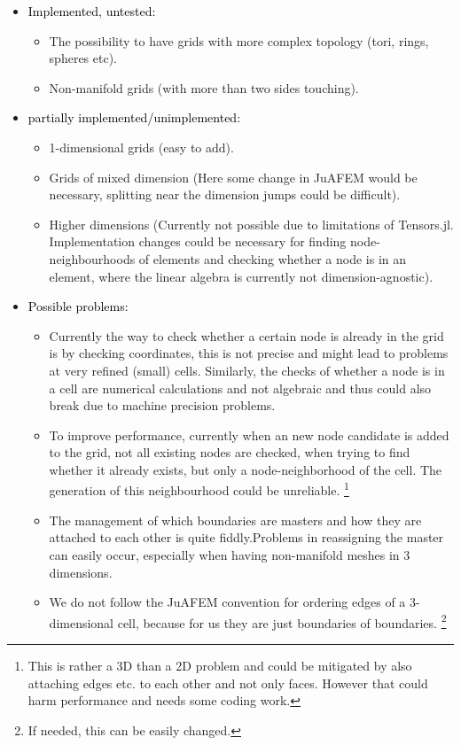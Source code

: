 \documentclass{article}
\begin{document}
\begin{itemize}
    \item \textcolor{black}{Implemented, untested:} 
    \begin{itemize}
    \item The possibility to have grids with more complex topology (tori, rings, spheres etc).
        \item Non-manifold grids (with more than two sides touching).
    \end{itemize}
    \item \textcolor{black}{partially implemented/unimplemented:}
    \begin{itemize}\item 1-dimensional grids (easy to add). \item Grids of mixed dimension (Here some change in JuAFEM would be necessary, splitting near the dimension jumps could be difficult).\item  Higher dimensions (Currently not possible due to limitations of Tensors.jl. Implementation changes could be necessary for finding node-neighbourhoods of elements and checking whether a node is in an element, where the linear algebra is currently not dimension-agnostic).
\end{itemize}
\item \textcolor{black}{Possible problems:}
    \begin{itemize}
        \item Currently the way to check whether a certain node is already in the grid is by checking coordinates, this is not precise and might lead to problems at very refined (small) cells. Similarly, the checks of whether a node is in a cell are numerical calculations and not algebraic and thus could also break due to machine precision problems.
        \item To improve performance, currently when an new node candidate is added to the grid, not all existing nodes are checked, when trying to find whether it already exists, but only a node-neighborhood of the cell. The generation of this neighbourhood could be unreliable.  \footnote{This is rather a 3D than a 2D problem and could be mitigated by also attaching edges etc. to each other and not only faces. However that could harm performance and needs some coding work.}
        \item The management of which boundaries are masters and how they are attached to each other is quite fiddly.Problems in reassigning the master can easily occur, especially when having non-manifold meshes in 3 dimensions. 
        \item We do not follow the JuAFEM convention for ordering edges of a 3-dimensional cell, because for us they are just boundaries of boundaries. \footnote{If needed, this can be easily changed.}
    \end{itemize}


\end{itemize}
\end{document}
